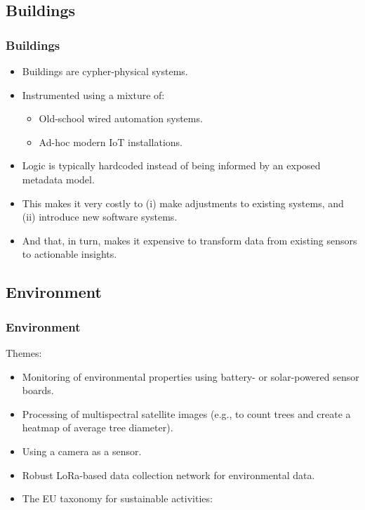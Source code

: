 \subsection{Buildings}
\begin{frame}
    \frametitle{Buildings}
    \vspace{3mm}
    \begin{itemize}
        \item Buildings are cypher-physical systems.
        \item Instrumented using a mixture of:
          \begin{itemize}
            \item Old-school wired automation systems.
            \item Ad-hoc modern IoT installations.
          \end{itemize}
        \item Logic is typically hardcoded instead of being informed by an exposed metadata model.
        \item This makes it very costly to (i) make adjustments to existing systems, and (ii) introduce new software systems.
        \item And that, in turn, makes it expensive to transform data from existing sensors to actionable insights.
    \end{itemize}
\end{frame}

\subsection{Environment}
\begin{frame}
    \frametitle{Environment}
    \vspace{3mm}
    Themes:
    \begin{itemize}
        \item Monitoring of environmental properties using battery- or solar-powered sensor boards.
        \item Processing of multispectral satellite images (e.g., to count trees and create a heatmap of average tree diameter).
        \item Using a camera as a sensor.
        \item Robust LoRa-based data collection network for environmental data.
        \item The EU taxonomy for sustainable activities:
          \\
    \end{itemize}
\end{frame}

